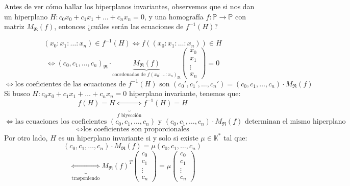 Antes de ver cómo hallar los hiperplanos invariantes, observemos que si nos dan un hiperplano $H : c_0 x_0 + c_1 x_1 + \ldots + c_n x_n = 0$, y una homografía $f: \mathbb{P} \to \mathbb{P}$ con matriz $M_{\mathfrak{R}}(f)$, entonces ¿cuáles serán las ecuaciones de $f^{-1}(H)$?

\[
    (x_0: x_1: \ldots : x_n) \in f^{-1}(H) \iff f((x_0: x_1: \ldots : x_n)) \in H
\]
\[
    \iff (c_0, c_1, \ldots, c_n)_{\mathfrak{R}} \cdot \underbrace{M_{\mathfrak{R}}(f)}_{\text{coordenadas de $f(x_0 : \ldots : x_n)_{\mathfrak{R}}$}} \begin{pmatrix}
        x_0 \\ x_1 \\ \vdots \\ x_n
    \end{pmatrix} = 0 
\]
\[
    \iff \text{los coeficientes de las ecuaciones de } f^{-1}(H) \text{ son } (c_0', c_1', \ldots, c_n') = (c_0, c_1, \ldots, c_n) \cdot M_{\mathfrak{R}}(f)
\]
Si busco $H : c_0 x_0 + c_1 x_1 + \ldots + c_n x_n = 0$ hiperplano invariante, tenemos que:
\[
    f(H) = H \underbrace{\iff}_{\text{$f$ biyección}} f^{-1}(H) = H
\]
\[
    \iff \text{las ecuaciones los coeficientes $(c_0, c_1, \ldots, c_n)$ y $(c_0, c_1, \ldots, c_n) \cdot M_{\mathfrak{R}}(f)$ determinan el mismo hiperplano}
\] 
\[
    \iff \text{los coeficientes son proporcionales}
\]
Por otro lado, $H$ es un hiperplano invariante si y solo si existe $\mu \in \mathbb{K}^*$ tal que:
\[
    (c_0, c_1, \ldots, c_n) \cdot M_{\mathfrak{R}}(f) = \mu (c_0, c_1, \ldots, c_n)
\]
\[
    \underbrace{\iff}_{\text{trasponiendo}} M_{\mathfrak{R}}(f)^T \begin{pmatrix}
        c_0 \\ c_1 \\ \vdots \\ c_n
    \end{pmatrix} = \mu \begin{pmatrix}
        c_0 \\ c_1 \\ \vdots \\ c_n
    \end{pmatrix}
\]

